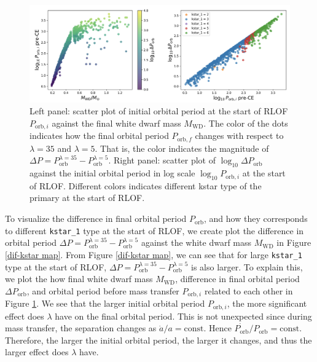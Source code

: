 \documentclass[12pt]{article}
\newcommand{\MWD}{M_{\mathrm{WD}}}
\newcommand{\Porb}{P_{\mathrm{orb}}}
\begin{document}
\begin{figure}
  \centering
  \includegraphics[width=\linewidth]{fig/dif-kstar two plot.png}
  \caption{Left panel: scatter plot of initial orbital period at the start of RLOF $P_{\mathrm{orb}, i}$ against the final white dwarf mass $\MWD$. The color of the dots indicates how the final orbital period $P_{\mathrm{orb}, f}$ changes with respect to $\lambda=35$ and $\lambda=5$. That is, the color indicates the magnitude of $\Delta P = P_{\mathrm{orb}}^{\lambda = 35} - P_{\mathrm{orb}}^{\lambda = 5}$. Right panel: scatter plot of $\log_{10} \Delta \Porb$ against the initial orbital period in log scale $\log_{10} P_{\mathrm{orb}, i}$ at the start of RLOF. Different colors indicates different kstar type of the primary at the start of RLOF.}
  \label{dif-kstar-exp}
\end{figure}

To visualize the difference in final orbital period $\Porb$, and how they corresponds to different \verb|kstar_1| type at the start of RLOF, we create plot the difference in orbital period $\Delta P = P_{\mathrm{orb}}^{\lambda = 35} - P_{\mathrm{orb}}^{\lambda = 5}$ against the white dwarf mass $\MWD$ in Figure \ref{dif-kstar map}. From Figure \ref{dif-kstar map}, we can see that for large \verb|kstar_1| type at the start of RLOF, $\Delta P = P_{\mathrm{orb}}^{\lambda = 35} - P_{\mathrm{orb}}^{\lambda = 5}$ is also larger. To explain this, we plot the how final white dwarf mass $\MWD$, difference in final orbital period $\Delta \Porb$, and orbital period before mass transfer $P_{\mathrm{orb}, i}$ related to each other in Figure \ref{dif-kstar-exp}. We see that the larger initial orbital period $P_{\mathrm{orb}, i}$, the more significant effect does $\lambda$ have on the final orbital period. This is not unexpected since during mass transfer, the separation changes as $\dot{a} / a = \text{const}$. Hence $\dot{\Porb} / \Porb = \text{const}$. Therefore, the larger the initial orbital period, the larger it changes, and thus the larger effect does $\lambda$ have.

\newpage


\end{document}
